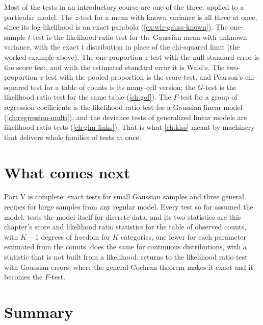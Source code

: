 \begin{bridge}
Most of the tests in an introductory course are one of the three, applied to a particular model.
The $z$-test for a mean with known variance is all three at once, since its log-likelihood is an exact parabola (\cref{ex:wlr-gauss-known}).
The one-sample $t$-test is the likelihood ratio test for the Gaussian mean with unknown variance, with the exact $t$ distribution in place of the chi-squared limit (the worked example above).
The one-proportion $z$-test with the null standard error is the score test, and with the estimated standard error it is Wald's.
The two-proportion $z$-test with the pooled proportion is the score test, and Pearson's chi-squared test for a table of counts is its many-cell version; the $G$-test is the likelihood ratio test for the same table (\cref{ch:gof}).
The $F$-test for a group of regression coefficients is the likelihood ratio test for a Gaussian linear model (\cref{ch:regression-multi}), and the deviance tests of generalized linear models are likelihood ratio tests (\cref{ch:glm-links}).
That is what \cref{ch:kiss} meant by machinery that delivers whole families of tests at once.
\end{bridge}

\section{What comes next}
\label{sec:wlr-next}

Part V is complete: exact tests for small Gaussian samples and three general recipes for large samples from any regular model.
Every test so far assumed the model.
 tests the model itself for discrete data, and its two statistics are this chapter's score and likelihood ratio statistics for the table of observed counts, with $K - 1$ degrees of freedom for $K$ categories, one fewer for each parameter estimated from the counts.
 does the same for continuous distributions, with a statistic that is not built from a likelihood.
 returns to the likelihood ratio test with Gaussian errors, where the general Cochran theorem makes it exact and it becomes the $F$-test.

\section{Summary}
\label{sec:wlr-summary}

